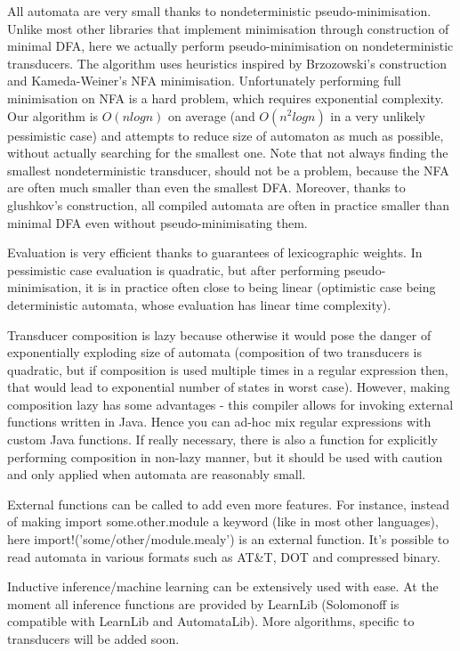 All automata are very small thanks to nondeterministic pseudo-minimisation. Unlike most other libraries that implement minimisation through construction of minimal DFA, here we actually perform pseudo-minimisation on nondeterministic transducers. The algorithm uses heuristics inspired by Brzozowski's construction and Kameda-Weiner's NFA minimisation. Unfortunately performing full minimisation on NFA is a hard problem, which requires exponential complexity. Our algorithm is $O(n log n)$ on average (and $O(n^2 log n)$ in a very unlikely pessimistic case) and attempts to reduce size of automaton as much as possible, without actually searching for the smallest one. Note that not always finding the smallest nondeterministic transducer, should not be a problem, because the NFA are often much smaller than even the smallest DFA. Moreover, thanks to glushkov's construction, all compiled automata are often in practice smaller than minimal DFA even without pseudo-minimisating them.

Evaluation is very efficient thanks to guarantees of lexicographic weights. In pessimistic case evaluation is quadratic, but after performing pseudo-minimisation, it is in practice often close to being linear (optimistic case being deterministic automata, whose evaluation has linear time complexity).

Transducer composition is lazy because otherwise it would pose the danger of exponentially exploding size of automata (composition of two transducers is quadratic, but if composition is used multiple times in a regular expression then, that would lead to exponential number of states in worst case). However, making composition lazy has some advantages - this compiler allows for invoking external functions written in Java. Hence you can ad-hoc mix regular expressions with custom Java functions. If really necessary, there is also a function for explicitly performing composition in non-lazy manner, but it should be used with caution and only applied when automata are reasonably small.

External functions can be called to add even more features. For instance, instead of making import some.other.module a keyword (like in most other languages), here import!('some/other/module.mealy') is an external function. It's possible to read automata in various formats such as AT\&T, DOT and compressed binary.


Inductive inference/machine learning can be extensively used with ease. At the moment all inference functions are provided by LearnLib (Solomonoff is compatible with LearnLib and AutomataLib). More algorithms, specific to transducers will be added soon.

